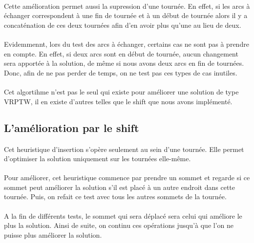 \documentclass[12pt]{article}
\begin{document}
\paragraph{}
Cette amélioration permet aussi la supression d'une tournée. En effet, si les arcs à échanger correspondent à une fin de tournée et à un début de tournée 
alors il y a concaténation de ces deux tournées afin d'en avoir plus qu'une au lieu de deux.

\paragraph{}
Evidemmennt, lors du test des arcs à échanger, certains cas ne sont pas à prendre en compte. En effet, si deux arcs sont en début de tournée, aucun changement 
sera apportée à la solution, de même si nous avons deux arcs en fin de tournées. Donc, afin de ne pas perder de temps, on ne test pas ces types de 
cas inutiles.

\paragraph{}
Cet algortihme n'est pas le seul qui existe pour améliorer une solution de type VRPTW, il en existe d'autres telles que le shift que nous avons implémenté.

\subsection{L'amélioration par le shift}

\paragraph{}
Cet heuristique d'insertion s'opère seulement au sein d'une tournée. Elle permet d'optimiser la solution uniquement sur les tournées elle-même.

\paragraph{}
Pour améliorer, cet heuristique commence par prendre un sommet et regarde si ce sommet peut améliorer la solution s'il est placé à un autre endroit 
dans cette tournée. Puis, on refait ce test avec tous les autres sommets de la tournée. 

\paragraph{}
A la fin de différents tests, le sommet qui sera déplacé sera celui qui améliore le plus la solution. Ainsi de suite, on continu ces opérations 
jusqu'à que l'on ne puisse plus améliorer la solution.
\end{document}
